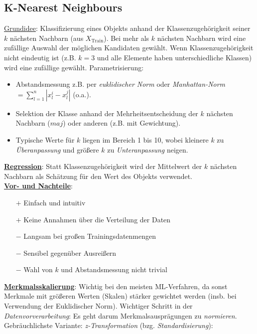 \subsection{K-Nearest Neighbours}
\label{knn}
\underline{Grundidee}: Klassifizierung eines Objekts anhand der Klassenzugehörigkeit seiner $k$ nächsten Nachbarn (aus $X_\text{Train}$). Bei mehr als $k$ nächsten Nachbarn wird eine zufällige Auswahl der möglichen Kandidaten gewählt. Wenn Klassenzugehörigkeit nicht eindeutig ist (z.B. $k=3$ und alle Elemente haben unterschiedliche Klassen) wird eine zufällige gewählt. Parametrisierung:

\begin{itemize}
    \item Abstandsmessung z.B. per \emph{euklidischer Norm} oder \emph{Manhattan-Norm} $=\sum_{l=1}^{n}|x^i_l-x^j_l|$ (o.a.).
    \item Selektion der Klasse anhand der Mehrheitsentscheidung der $k$ nächsten Nachbarn ($maj$) oder anderen (z.B. mit Gewichtung).
    \item Typische Werte für $k$ liegen im Bereich 1 bis 10, wobei kleinere $k$ zu \emph{Überanpassung} und größere $k$ zu \emph{Unteranpassung} neigen.
\end{itemize}

\underline{\textbf{Regression}}: Statt Klassenzugehörigkeit wird der Mittelwert der $k$ nächsten Nachbarn als Schätzung für den Wert des Objekts verwendet.\\

\underline{\textbf{Vor- und Nachteile}}:
\begin{itemize}
    \item[$+$] Einfach und intuitiv
    \item[$+$] Keine Annahmen über die Verteilung der Daten
    \item[$-$] Langsam bei großen Trainingsdatenmengen
    \item[$-$] Sensibel gegenüber Ausreißern
    \item[$-$] Wahl von $k$ und Abstandsmessung nicht trivial\\
\end{itemize}

\underline{\textbf{Merkmalsskalierung}}: Wichtig bei den meisten ML-Verfahren, da sonst Merkmale mit größeren Werten (Skalen) stärker gewichtet werden (insb. bei Verwendung der Euklidischer Norm). Wichtiger Schritt in der \emph{Datenvorverarbeitung}: Es geht darum Merkmalsausprägungen zu \emph{normieren}. Gebräuchlichste Variante: \emph{z-Transformation} (bzg. \emph{Standardisierung}):

